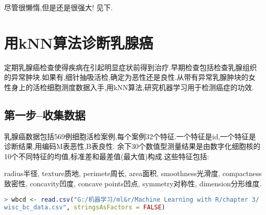 \documentclass[11pt,a4paper,oneside]{book}
\begin{document}
尽管很懒惰,但是还是很强大! 见下.

\section{用kNN算法诊断乳腺癌}
定期乳腺癌检查使得疾病在引起明显症状前得到治疗.早期检查包括检查乳腺组织的异常肿块.如果有,细针抽吸活检,确定为恶性还是良性.从带有异常乳腺肿块的女性身上的活检细胞测度数据入手,用kNN算法,研究机器学习用于检测癌症的功效.
\subsection{第一步--收集数据}
乳腺癌数据包括569例细胞活检案例,每个案例32个特征.一个特征是id,一个特征是诊断结果,用编码M表恶性,B表良性.
余下30个数值型测量结果是由数字化细胞核的10个不同特征的均值,标准差和最差值(最大值)构成.这些特征包括:

radius半径, texture质地, perimete周长, area面积, smoothness光滑度, compactness致密性, concavity凹度, concave points凹点, symmetry对称性, dimension分形维度.
\begin{lstlisting}[language=r]
> wbcd <- read.csv("G:/机器学习/ml&r/Machine Learning with R/chapter 3/
wisc_bc_data.csv", stringsAsFactors = FALSE)
\end{lstlisting}
\end{document}
